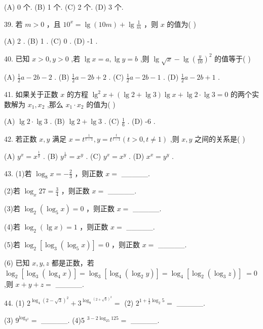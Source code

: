 \documentclass[10pt]{article}
\begin{document}
(A) 0 个. (B) 1 个. (C) 2 个. (D) 3 个.

39. 若 \(m > 0\) ，且 \({10}^{x} = \lg \left( {10m}\right)  + \lg \frac{1}{m}\) ，则 \(x\) 的值为( )

(A) 2 . (B) 1 . (C) 0 . (D) -1 .

40. 已知 \(x > 0,y > 0\) ,若 \(\lg x = a,\lg y = b\) ,则 \(\lg \sqrt{x} - \lg {\left( \frac{y}{10}\right) }^{2}\) 的值等于( )

(A) \(\frac{1}{2}a - {2b} - 2\) . (B) \(\frac{1}{2}a - {2b} + 2\) . (C) \(\frac{1}{2}a - {2b} - 1\) . (D) \(\frac{1}{2}a - {2b} + 1\) .

41. 如果关于正数 \(x\) 的方程 \({\lg }^{2}x + \left( {\lg 2 + \lg 3}\right) \lg x + \lg 2 \cdot  \lg 3 = 0\) 的两个实数解为 \({x}_{1},{x}_{2}\) ,那么 \({x}_{1} \cdot  {x}_{2}\) 的值为( )

(A) \(\lg 2 \cdot  \lg 3\) . (B) \(\lg 2 + \lg 3\) . (C) \(\frac{1}{6}\) . (D) -6 .

42. 若正数 \(x,y\) 满足 \(x = {t}^{\frac{1}{t - 1}},y = {t}^{\frac{t}{t - 1}}\left( {t > 0,t \neq  1}\right)\) ,则 \(x,y\) 之间的关系是( )

(A) \({y}^{x} = {x}^{\frac{1}{y}}\) . (B) \({y}^{\frac{1}{x}} = {x}^{y}\) . (C) \({y}^{x} = {x}^{y}\) . (D) \({x}^{x} = {y}^{y}\) .

43. (1)若 \({\log }_{8}x =  - \frac{2}{3}\) ，则正数 \(x =\) \_\_\_\_\_.

(2)若 \({\log }_{x}{27} = \frac{3}{4}\) ，则正数 \(x =\) \_\_\_\_\_.

(3)若 \({\log }_{2}\left( {{\log }_{5}x}\right)  = 0\) ，则正数 \(x =\) \_\_\_\_\_.

(4)若 \({\log }_{2}\left( {\lg x}\right)  = 1\) ，则正数 \(x =\) \_\_\_\_\_.

(5)若 \({\log }_{2}\left\lbrack  {{\log }_{3}\left( {{\log }_{5}x}\right) }\right\rbrack   = 0\) ，则正数 \(x =\) \_\_\_\_\_.

(6) 已知 \(x,y,z\) 都是正数，若 \({\log }_{2}\left\lbrack  {{\log }_{3}\left( {{\log }_{4}x}\right) }\right\rbrack   = {\log }_{3}\left\lbrack  {{\log }_{4}\left( {{\log }_{2}y}\right) }\right\rbrack   = {\log }_{4}\left\lbrack  {{\log }_{2}\left( {{\log }_{3}z}\right) }\right\rbrack \; = 0\) ,则 \(x + y + z =\) \_\_\_\_\_.

44. (1) \({2}^{{\log }_{4}{\left( 2 - \sqrt{3}\right) }^{2}} + {3}^{{\log }_{9}{}^{{\left( 2 + \sqrt{3}\right) }^{2}}} =\) (2) \({2}^{1 + \frac{1}{2}{\log }_{2}5} =\) \_\_\_\_\_.

(3) \({9}^{{\log }_{{3}^{2}}} =\) \_\_\_\_\_. (4)5 \({}^{3 - 2{\log }_{25}{125}} =\) \_\_\_\_\_.
\end{document}
